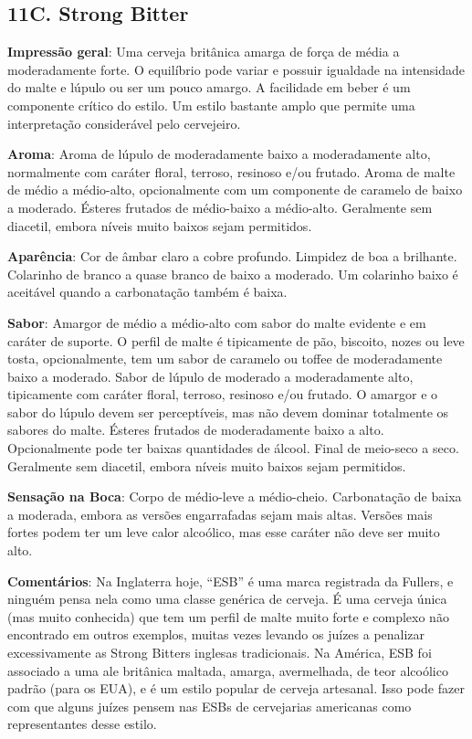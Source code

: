 \subsection*{11C. Strong Bitter}
\textbf{Impressão geral}: Uma cerveja britânica amarga de força de média a moderadamente forte. O equilíbrio pode variar e possuir igualdade na intensidade do malte e lúpulo ou ser um pouco amargo. A facilidade em beber é um componente crítico do estilo. Um estilo bastante amplo que permite uma interpretação considerável pelo cervejeiro.

\textbf{Aroma}: Aroma de lúpulo de moderadamente baixo a moderadamente alto, normalmente com caráter floral, terroso, resinoso e/ou frutado. Aroma de malte de médio a médio-alto, opcionalmente com um componente de caramelo de baixo a moderado. Ésteres frutados de médio-baixo a médio-alto. Geralmente sem diacetil, embora níveis muito baixos sejam permitidos.

\textbf{Aparência}: Cor de âmbar claro a cobre profundo. Limpidez de boa a brilhante. Colarinho de branco a quase branco de baixo a moderado. Um colarinho baixo é aceitável quando a carbonatação também é baixa.

\textbf{Sabor}: Amargor de médio a médio-alto com sabor do malte evidente e em caráter de suporte. O perfil de malte é tipicamente de pão, biscoito, nozes ou leve tosta, opcionalmente, tem um sabor de caramelo ou toffee de moderadamente baixo a moderado. Sabor de lúpulo de moderado a moderadamente alto, tipicamente com caráter floral, terroso, resinoso e/ou frutado. O amargor e o sabor do lúpulo devem ser perceptíveis, mas não devem dominar totalmente os sabores do malte. Ésteres frutados de moderadamente baixo a alto. Opcionalmente pode ter baixas quantidades de álcool. Final de meio-seco a seco. Geralmente sem diacetil, embora níveis muito baixos sejam permitidos.

\textbf{Sensação na Boca}: Corpo de médio-leve a médio-cheio. Carbonatação de baixa a moderada, embora as versões engarrafadas sejam mais altas. Versões mais fortes podem ter um leve calor alcoólico, mas esse caráter não deve ser muito alto.

\textbf{Comentários}: Na Inglaterra hoje, “ESB” é uma marca registrada da Fullers, e ninguém pensa nela como uma classe genérica de cerveja. É uma cerveja única (mas muito conhecida) que tem um perfil de malte muito forte e complexo não encontrado em outros exemplos, muitas vezes levando os juízes a penalizar excessivamente as Strong Bitters inglesas tradicionais. Na América, ESB foi associado a uma ale britânica maltada, amarga, avermelhada, de teor alcoólico padrão (para os EUA), e é um estilo popular de cerveja artesanal. Isso pode fazer com que alguns juízes pensem nas ESBs de cervejarias americanas como representantes desse estilo.

